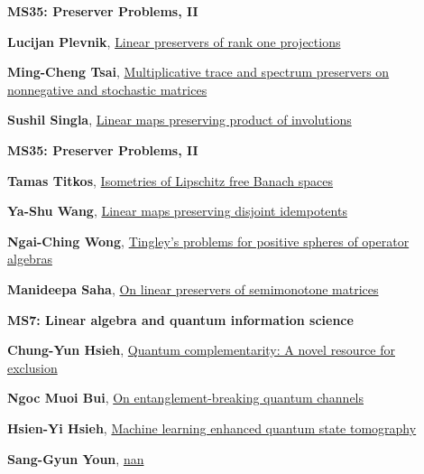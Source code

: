 \documentclass[ILAS2025-program.tex]{subfiles}
\begin{document}
        \begin{description}
    \item[] {\color{mstitle}\textbf{MS35: Preserver Problems, II}} 
    \item[] \hypertarget{up0280}{}\textbf{Lucijan Plevnik}, \hyperlink{down0280}{Linear preservers of rank one projections}
        \item[] \hypertarget{up0281}{}\textbf{Ming-Cheng Tsai}, \hyperlink{down0281}{Multiplicative trace and spectrum preservers  on   nonnegative and stochastic matrices
}
        \item[] \hypertarget{up0282}{}\textbf{Sushil Singla}, \hyperlink{down0282}{Linear maps preserving product of involutions}
        \end{description}
    \begin{description}
    \item[] {\color{mstitle}\textbf{MS35: Preserver Problems, II}} 
    \item[] \hypertarget{up0315}{}\textbf{Tamas Titkos}, \hyperlink{down0315}{Isometries of Lipschitz free Banach spaces}
        \item[] \hypertarget{up0316}{}\textbf{Ya-Shu Wang}, \hyperlink{down0316}{Linear maps preserving disjoint idempotents
}
        \item[] \hypertarget{up0317}{}\textbf{Ngai-Ching Wong}, \hyperlink{down0317}{Tingley's problems for positive spheres of operator algebras}
        \item[] \hypertarget{up0318}{}\textbf{Manideepa Saha}, \hyperlink{down0318}{On linear preservers of semimonotone matrices}
        \end{description}
    \begin{description}
    \item[] {\color{mstitle}\textbf{MS7: Linear algebra and quantum information science}} 
    \item[] \hypertarget{up0359}{}\textbf{Chung-Yun Hsieh}, \hyperlink{down0359}{Quantum complementarity: A novel resource for exclusion}
        \item[] \hypertarget{up0360}{}\textbf{Ngoc Muoi Bui}, \hyperlink{down0360}{On entanglement-breaking quantum channels}
        \item[] \hypertarget{up0361}{}\textbf{Hsien-Yi Hsieh}, \hyperlink{down0361}{Machine learning enhanced quantum state tomography}
        \item[] \hypertarget{up0362}{}\textbf{Sang-Gyun Youn}, \hyperlink{down0362}{nan}
        \end{description}
    \newpage
\end{document}
